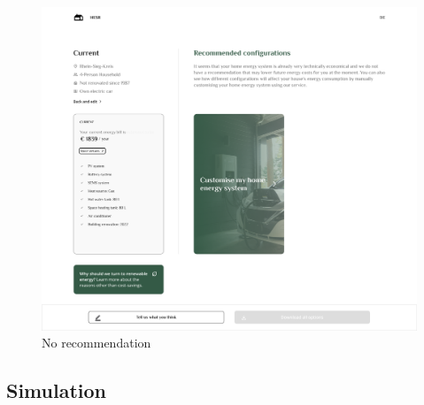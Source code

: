 \begin{figure}[h!]
  \centering
  \includegraphics[width=\textwidth]{Images/recommendation_null.png}
  \caption{No recommendation}
  \label{fig:recommendation_null}
\end{figure}


\subsection*{Simulation}

